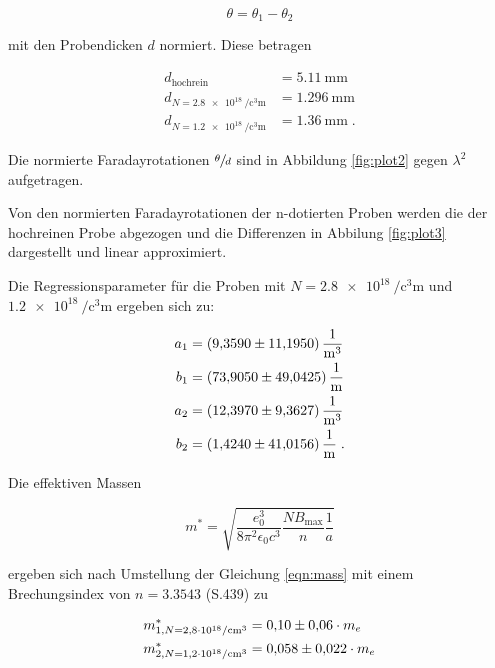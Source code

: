 \begin{equation}
    \theta = \theta_1 - \theta_2
\end{equation}

mit den Probendicken $d$ normiert.
Diese betragen

\begin{align*}
    d_\text{hochrein} &= \SI{5.11}{\milli\meter} \\
    d_{N = \SI{2.8e18}{\per\cubic\centi\meter}} &= \SI{1.296}{\milli\meter} \\
    d_{N = \SI{1.2e18}{\per\cubic\centi\meter}} &= \SI{1.36}{\milli\meter} \; .
\end{align*}

Die normierte Faradayrotationen $\sfrac{\theta}{d}$ sind in Abbildung \ref{fig:plot2} gegen $\lambda^2$ aufgetragen.

Von den normierten Faradayrotationen der n-dotierten Proben werden die der hochreinen Probe abgezogen und die Differenzen
in Abbilung \ref{fig:plot3} dargestellt und linear approximiert.

Die Regressionsparameter für die Proben mit $N = \SI{2.8e18}{\per\cubic\centi\meter}$ und 
$\SI{1.2e18}{\per\cubic\centi\meter}$ ergeben sich zu:

\begin{align*}
    a_1 &= \SI{ 9.359 +- 11.1950}{\meter\tothe{-3}}\\
    b_1 &= \SI{73.905 +- 49.0425}{\meter\tothe{-1}}\\
    a_2 &= \SI{12.397 +-  9.3627}{\meter\tothe{-3}}\\
    b_2 &= \SI{ 1.424 +- 41.0156}{\meter\tothe{-1}}\; .
\end{align*}

Die effektiven Massen 

\begin{equation}
    m^* = \sqrt{\frac{e_0^3}{8\pi^2\epsilon_0 c^3} \frac{NB_\text{max}}{n} \frac{1}{a}}
\end{equation}

ergeben sich nach Umstellung der Gleichung \eqref{eqn:mass} mit einem Brechungsindex von $n = \num{3.3543}$ \cite{Brech} (S.439) zu 
 
\begin{align*}
    m^*_{1,N = \SI{2.8e18}{\per\cubic\centi\meter}} &= \num{0.10 +- 0.06} \cdot m_e \\
    m^*_{2,N = \SI{1.2e18}{\per\cubic\centi\meter}} &= \num{0.058 +- 0.022} \cdot m_e 
\end{align*}

